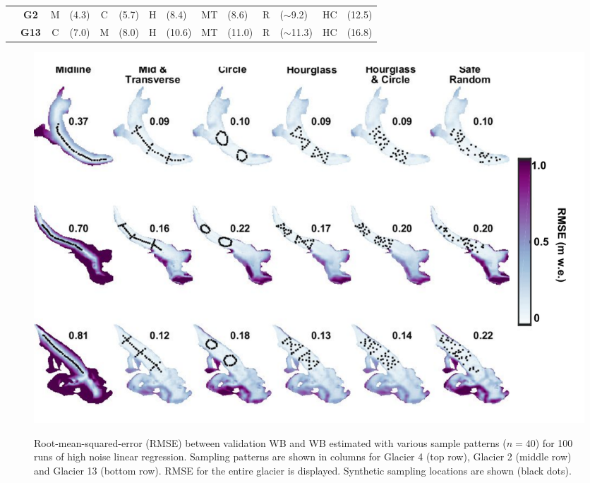 \documentclass[twocolumn,letterpaper]{igs}
\begin{document}
\begin{table}[]
\begin{tabular}{lcclclclclclcl}
 & \textbf{G2} & \textcolor{M}{M} & (4.3) & \textcolor{C}{C} & (5.7) & \textcolor{H}{H} & (8.4) & \textcolor{MT}{MT} & (8.6) & \textcolor{R}{R} & ($\sim$9.2) & \textcolor{HC}{HC} & (12.5) \\
 & \textbf{G13} & \textcolor{C}{C} & (7.0) & \textcolor{M}{M} & (8.0) & \textcolor{H}{H} & (10.6) & \textcolor{MT}{MT} & (11.0) & \textcolor{R}{R} & ($\sim$11.3) & \textcolor{HC}{HC} & (16.8)
\end{tabular}
\end{table}

\begin{figure}
	\centering
	\includegraphics[width =\textwidth]{SynObsRMSEmap.pdf}\\
	\caption{Root-mean-squared-error (RMSE) between validation WB and WB estimated with various sample patterns ($n=40$) for 100 runs of high noise linear regression. Sampling patterns are shown in columns for Glacier 4 (top row), Glacier 2 (middle row) and Glacier 13 (bottom row). RMSE for the entire glacier is displayed. Synthetic sampling locations are shown (black dots).}
	\label{fig:SynObsRMSEmap}
\end{figure}
\end{document}
